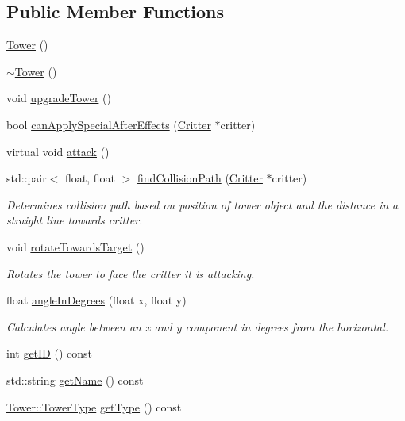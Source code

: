\subsection*{Public Member Functions}
\begin{DoxyCompactItemize}
\item 
\hyperlink{class_tower_a1b785dc1e9fb979a10620ca183b5761d}{Tower} ()
\item 
\hyperlink{class_tower_a96972da33c287758c036c944eccdc5fe}{$\sim$\+Tower} ()
\item 
void \hyperlink{class_tower_a3ae303a04b27b7cb89ed478d492f1a64}{upgrade\+Tower} ()
\item 
bool \hyperlink{class_tower_aa4d0884a1fc45d6b47e8ed4a3cd23b34}{can\+Apply\+Special\+After\+Effects} (\hyperlink{class_critter}{Critter} $\ast$critter)
\item 
virtual void \hyperlink{class_tower_a9f067c2b9e5e6987f341704b8b098606}{attack} ()
\item 
std\+::pair$<$ float, float $>$ \hyperlink{class_tower_a3e68908edd23da1f69b78017e58c27eb}{find\+Collision\+Path} (\hyperlink{class_critter}{Critter} $\ast$critter)
\begin{DoxyCompactList}\small\item\em Determines collision path based on position of tower object and the distance in a straight line towards critter. \end{DoxyCompactList}\item 
void \hyperlink{class_tower_a7deaf3f9565d32468d3056fa5bcc43b0}{rotate\+Towards\+Target} ()
\begin{DoxyCompactList}\small\item\em Rotates the tower to face the critter it is attacking. \end{DoxyCompactList}\item 
float \hyperlink{class_tower_a87355667f1139c8744042879ee0936ad}{angle\+In\+Degrees} (float x, float y)
\begin{DoxyCompactList}\small\item\em Calculates angle between an x and y component in degrees from the horizontal. \end{DoxyCompactList}\item 
int \hyperlink{class_tower_abe79d42828ca9c8ba4b60263e566697f}{get\+I\+D} () const 
\item 
std\+::string \hyperlink{class_tower_ad830cdd9f1870479b5763b7ee9c33c8d}{get\+Name} () const 
\item 
\hyperlink{class_tower_a110a21c18d4ec095c6234bd17f004b3e}{Tower\+::\+Tower\+Type} \hyperlink{class_tower_a87db306927fd4022cae1369b88688ed7}{get\+Type} () const 

\end{DoxyCompactItemize}
